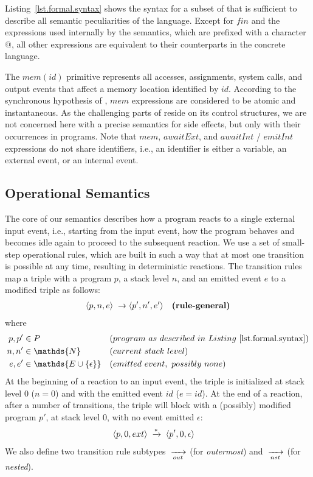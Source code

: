 Listing~\ref{lst.formal.syntax} shows the syntax for a subset of \CEU that is 
sufficient to describe all semantic peculiarities of the language.
%
Except for $fin$ and the expressions used internally by the semantics, which
are prefixed with a character $@$, all other expressions are equivalent to
their counterparts in the concrete language.

The $mem(id)$ primitive represents all accesses, assignments, system calls, and
output events that affect a memory location identified by $id$.
%
According to the synchronous hypothesis of \CEU, $mem$ expressions are 
considered to be atomic and instantaneous.
%
As the challenging parts of \CEU reside on its control structures, we are not 
concerned here with a precise semantics for side effects, but only with their 
occurrences in programs.
%
%
Note that $mem$, $awaitExt$, and $awaitInt$ / $emitInt$ expressions do not
share identifiers, i.e., an identifier is either a variable, an external event,
or an internal event.

\subsection{Operational Semantics}

The core of our semantics describes how a program reacts to a single external 
input event, i.e., starting from the input event, how the program behaves and 
becomes idle again to proceed to the subsequent reaction.
%
We use a set of small-step operational rules, which are built in such a way 
that at most one transition is possible at any time, resulting in deterministic 
reactions.
%
The transition rules map a triple with a program $p$, a stack level $n$, and an
emitted event $e$ to a modified triple as follows:
%
\begin{align*}
\langle p,  n,  e  \rangle &\;\xrightarrow{\;}
\langle p', n', e' \rangle
    & \textbf{(rule-general)}
\end{align*}
%
where
%
\begin{align*}
p, p' &\in P
    && (program~as~described~in~Listing~\ref{lst.formal.syntax})
\\
n, n' &\in \mathds{N}
    && (current~stack~level)
\\
e, e' &\in \mathds{E \cup \{\epsilon\}}
    && (emitted~event,~possibly~none)
\end{align*}
%
At the beginning of a reaction to an input event, the triple is initialized at
stack level $0$ ($n=0$) and with the emitted event $id$ ($e=id$).
At the end of a reaction, after a number of transitions, the triple will block
with a (possibly) modified program $p'$, at stack level $0$, with no event
emitted $\epsilon$:
%
\begin{align*}
\langle p,0,ext \rangle
    & \;\xrightarrow{*}\;
\langle p',0,\epsilon \rangle
\end{align*}
%
We also define two transition rule subtypes $\;\xrightarrow[out]{\;}$ (for \emph{outermost}) and
$\;\xrightarrow[nst]{\;}$ (for \emph{nested}).

